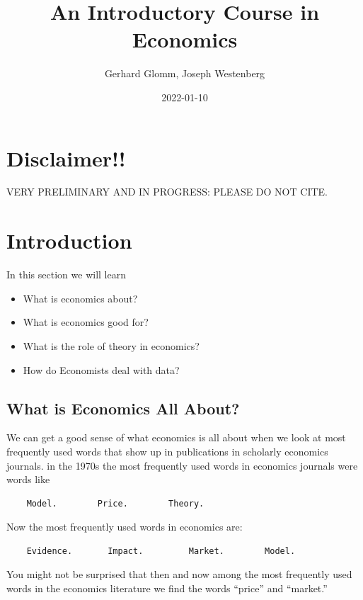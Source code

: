 \documentclass[
]{book}
\title{An Introductory Course in Economics}
\author{Gerhard Glomm, Joseph Westenberg}
\date{2022-01-10}
\providecommand{\tightlist}{%
  \setlength{\itemsep}{0pt}\setlength{\parskip}{0pt}}
\begin{document}
\maketitle

{
\setcounter{tocdepth}{1}
\tableofcontents
}
\hypertarget{disclaimer}{%
\chapter{Disclaimer!!}\label{disclaimer}}

VERY PRELIMINARY AND IN PROGRESS: PLEASE DO NOT CITE.

\hypertarget{intro}{%
\chapter{Introduction}\label{intro}}

In this section we will learn

\begin{itemize}
\tightlist
\item
  What is economics about?
\item
  What is economics good for?
\item
  What is the role of theory in economics?
\item
  How do Economists deal with data?
\end{itemize}

\hypertarget{what-is-economics-all-about}{%
\section{What is Economics All About?}\label{what-is-economics-all-about}}

We can get a good sense of what economics is all about when we look at most frequently used words that show up in publications in scholarly economics journals. in the 1970s the most frequently used words in economics journals were words like

\begin{verbatim}
    Model.        Price.        Theory.
\end{verbatim}

Now the most frequently used words in economics are:

\begin{verbatim}
    Evidence.       Impact.         Market.        Model.
\end{verbatim}

You might not be surprised that then and now among the most frequently used words in the economics literature we find the words ``price'' and ``market.''
\end{document}
